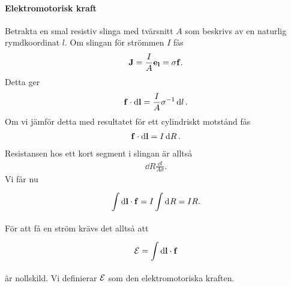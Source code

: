 \paragraph{Elektromotorisk kraft}
Betrakta en smal resistiv slinga med tvärsnitt $A$ som beskrivs av en naturlig rymdkoordinat $l$. Om slingan för strömmen $I$ fås
\begin{align*}
	\vb{J} = \frac{I}{A}\vb{e}_{\vb{l}} = \sigma\vb{f}.
\end{align*}
Detta ger
\begin{align*}
	\vb{f}\cdot\dd{\vb{l}} = \frac{I}{A}\sigma^{-1}\dd{l}.
\end{align*}
Om vi jämför detta med resultatet för ett cylindriskt motstånd fås
\begin{align*}
	\vb{f}\cdot\dd{\vb{l}} = I\dd{R}.
\end{align*}
Resistansen hos ett kort segment i slingan är alltså
\begin{align*}
	\dd{R} \frac{\dd{l}}{A\sigma}.
\end{align*}
Vi får nu
\begin{align*}
	\int\limits_{}^{}\dd{\vb{l}}\cdot \vb{f} = I\int\limits_{}^{}\dd[]{R} = IR.
\end{align*}
För att få en ström krävs det alltså att
\begin{align*}
	\mathcal{E} = \int\limits_{}^{}\dd{\vb{l}}\cdot \vb{f}
\end{align*}
är nollskild. Vi definierar $\mathcal{E}$ som den elektromotoriska kraften.